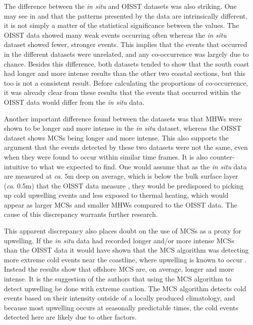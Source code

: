 \documentclass[a4paper,10pt,review]{elsarticle}
\begin{document}
The difference between the \emph{in situ} and OISST datasets was also striking. One may see in  and  that the patterns presented by the data are intrinsically different, it is not simply a matter of the statistical significance between the values. The OISST data showed many weak events occurring often whereas the \emph{in situ} dataset showed fewer, stronger events. This implies that the events that occurred in the different datasets were unrelated, and any co-occurrence was largely due to chance. Besides this difference, both datasets tended to show that the south coast had longer and more intense results than the other two coastal sections, but this too is not a consistent result. Before calculating the proportions of co-occurrence, it was already clear from these results that the events that occurred within the OISST data would differ from the \emph{in situ} data.

Another important difference found between the datasets was that MHWs were shown to be longer and more intense in the \emph{in situ} dataset, whereas the OISST dataset shows MCSs being longer and more intense. This also supports the argument that the events detected by these two datasets were not the same, even when they were found to occur within similar time frames. It is also counter-intuitive to what we expected to find. One would assume that as the \emph{in situ} data are measured at \emph{ca}. 5m deep on average, which is below the bulk surface layer (\emph{ca}. 0.5m) that the OISST data measure \cite{Reynolds2002}, they would be predisposed to picking up cold upwelling events and less exposed to thermal heating, which would appear as larger MCSs and smaller MHWs compared to the OISST data. The cause of this discrepancy warrants further research.

This apparent discrepancy also places doubt on the use of MCSs as a proxy for upwelling. If the \emph{in situ} data had recorded longer and/or more intense MCSs than the OISST data it would have shown that the MCS algorithm was detecting more extreme cold events near the coastline, where upwelling is known to occur \cite{Hutchings2009, Lutjeharms2000}. Instead the results show that offshore MCS are, on average, longer and more intense. It is the suggestion of the authors that using the MCS algorithm to detect upwelling be done with extreme caution. The MCS algorithm detects cold events based on their intensity outside of a locally produced climatology, and because most upwelling occurs at seasonally predictable times, the cold events detected here are likely due to other factors.
\end{document}

